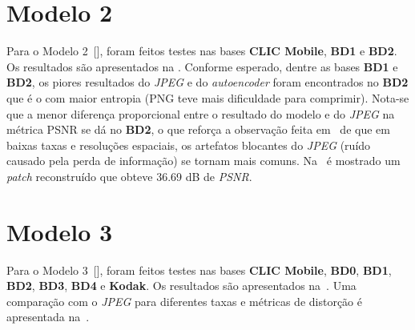 \section{Modelo 2}
\label{res:mod2}
Para o Modelo 2~[], foram feitos testes nas bases \textbf{\acrshort{CLIC} Mobile}, \textbf{BD1} e \textbf{BD2}. Os resultados são apresentados na . Conforme esperado, dentre as bases \textbf{BD1} e \textbf{BD2}, os piores resultados do \textit{JPEG} e do \textit{autoencoder} foram encontrados no \textbf{BD2} que é o com maior entropia (\acrshort{PNG} teve mais dificuldade para comprimir). Nota-se que a menor diferença proporcional entre o resultado do modelo e do \textit{JPEG} na métrica \acrshort{PSNR} se dá no \textbf{BD2}, o que reforça a observação feita em~\cite{toderici2015variable} de que em baixas taxas e resoluções espaciais, os artefatos blocantes do \textit{JPEG} (ruído causado pela perda de informação) se tornam mais comuns. Na~ é mostrado um \textit{patch} reconstruído que obteve 36.69 \acrshort{dB} de \textit{PSNR}.
\section{Modelo 3}
\label{res:mod3}
Para o Modelo 3~[], foram feitos testes nas bases \textbf{\acrshort{CLIC} Mobile}, \textbf{BD0}, \textbf{BD1}, \textbf{BD2}, \textbf{BD3}, \textbf{BD4} e \textbf{Kodak}. Os resultados são apresentados na~. Uma comparação com o \textit{JPEG} para diferentes taxas e métricas de distorção é apresentada na~.

